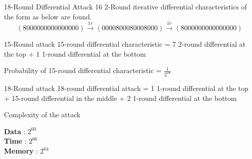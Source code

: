 \begin{frame}{18-Round Differential Attack}
    16 2-Round iterative differential characteristics of the form as below are found.
    $$(8000000000000000) \overset{1r}{\rightarrow} (0000800080008000) \overset{1r}{\rightarrow} (8000000000000000)$$
    \begin{block}{15-Round attack}
        15-round differential characteristic = 7 2-round differential at the top + 1 1-round differential at the bottom
	
	    Probability of 15-round differential characteristic = $ \frac{1}{2^{58}} $
    \end{block}
    
    \begin{block}{18-Round attack}
        18-round differential attack = 1 1-round differential at the top + 15-round differential in the middle + 2 1-round differential at the bottom
    \end{block}
\end{frame}

\begin{frame}{Complexity of the attack}
    \begin{block}{}
        \textbf{Data} : $2^{60}$\\
	    \textbf{Time} : $2^{66}$\\
	    \textbf{Memory} : $2^{64}$
    \end{block}
\end{frame}
